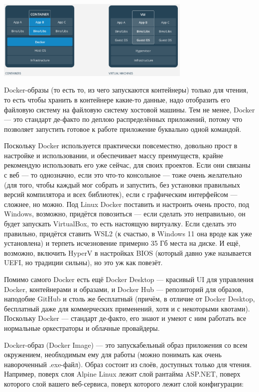 \documentclass{../../text-style}
\begin{document}
\begin{center}
    \includegraphics[width=0.7\textwidth]{docker.png}
\end{center}

Docker-образы (то есть то, из чего запускаются контейнеры) только для чтения, то есть чтобы хранить в контейнере какие-то данные, надо отобразить его файловую систему на файловую систему хостовой машины. Тем не менее, Docker --- это стандарт де-факто по деплою распределённых приложений, потому что позволяет запустить готовое к работе приложение буквально одной командой. 

Поскольку Docker используется практически повсеместно, довольно прост в настройке и использовании, и обеспечивает массу преимуществ, крайне рекомендую использовать его уже сейчас, для своих проектов. Если они связаны с веб --- то однозначно, если это что-то консольное --- тоже очень желательно (для того, чтобы каждый мог собрать и запустить, без установки правильных версий компилятора и всех библиотек), если с графическим интерфейсом --- сложнее, но можно. Под Linux Docker поставить и настроить очень просто, под Windows, возможно, придётся повозиться --- если сделать это неправильно, он будет запускать VirtualBox, то есть настоящую виртуалку. Если сделать это правильно, придётся ставить WSL2 (к счастью, в Windows 11 она вроде как уже установлена) и терпеть исчезновение примерно 35 Гб места на диске. И ещё, возможно, включить HyperV в настройках BIOS (который давно уже называется UEFI, но традиции сильны), но это уж как повезёт.

Помимо самого Docker есть ещё Docker Desktop --- красивый UI для управления Docker, контейнерами и образами, и Docker Hub --- репозиторий для образов, наподобие GitHub и столь же бесплатный (причём, в отличие от Docker Desktop, бесплатный даже для коммерческих применений, хотя и с некоторыми квотами). Поскольку Docker --- стандарт де-факто, его знают и умеют с ним работать все нормальные оркестраторы и облачные провайдеры.

Docker-образ (Docker Image) --- это запускабельный образ приложения со всем окружением, необходимым ему для работы (можно понимать как очень навороченный .exe-файл). Образ состоит из слоёв, доступных только для чтения. Например, поверх слоя Alpine Linux лежит слой рантайма ASP.NET, поверх которого слой вашего веб-сервиса, поверх которого лежит слой конфигурации:
\end{document}
